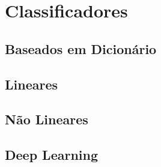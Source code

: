 \section{Classificadores}
\subsection{Baseados em Dicionário} \label{sec:dictionary}
\subsection{Lineares}
\subsection{Não Lineares}
\subsection{Deep Learning}



